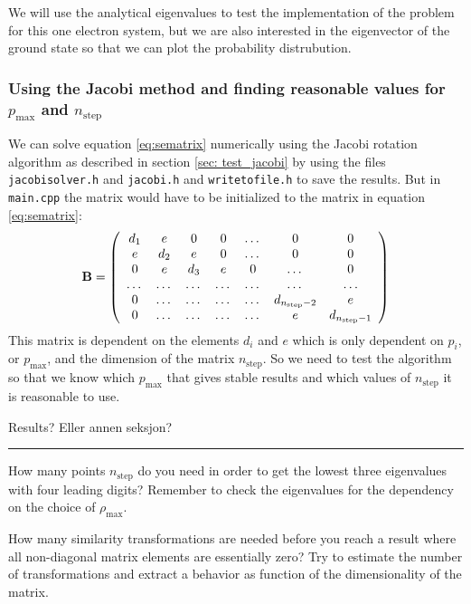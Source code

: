 \documentclass[11pt,a4wide]{article}
\begin{document}
We will use the analytical eigenvalues to test the implementation of the problem for this one electron system, but we are also interested in the eigenvector of the ground state so that we can plot the probability distrubution.

\subsubsection{Using the Jacobi method and finding reasonable values for $p_{\mathrm{max}}$ and $n_{\mathrm{step}}$}
We can solve equation \ref{eq:sematrix} numerically using the Jacobi rotation algorithm as described in section \ref{sec: test_jacobi} by using the files \texttt{jacobisolver.h} and \texttt{jacobi.h} and \texttt{writetofile.h} to save the results. But in \texttt{main.cpp} the matrix would have to be initialized to the matrix in equation \ref{eq:sematrix}:
\[
\bf B = \left( \begin{array}{ccccccc} d_1 & e & 0   & 0    & \dots  &0     & 0 \\
                                e & d_2 & e & 0    & \dots  &0     &0 \\
                                0   & e & d_3 & e  &0       &\dots & 0\\
                                \dots  & \dots & \dots & \dots  &\dots      &\dots & \dots\\
                                0   & \dots & \dots & \dots  &\dots       &d_{n_{\mathrm{step}}-2} & e\\
                                0   & \dots & \dots & \dots  &\dots       &e & d_{n_{\mathrm{step}}-1}

             \end{array} \right)
\]
This matrix is dependent on the elements $d_i$ and $e$ which is only dependent on $p_i$, or $p_{\mathrm{max}}$, and the dimension of the matrix $n_{\mathrm{step}}$. So we need to test the algorithm so that we know which  $p_{\mathrm{max}}$ that gives stable results and which values of $n_{\mathrm{step}}$ it is reasonable to use. 

Results? Eller annen seksjon?



\noindent\rule{\textwidth}{1pt}
How many points $n_{\mathrm{step}}$
do you need in order to get the lowest three eigenvalues 
with four leading digits?  
Remember to check the eigenvalues for 
the dependency on the choice of $\rho_{\mathrm{max}}$.

How many similarity transformations are needed before you reach a 
result where all non-diagonal matrix elements are essentially zero?
Try to estimate the number of transformations and extract a behavior as function
of the dimensionality of the matrix.
\end{document}
